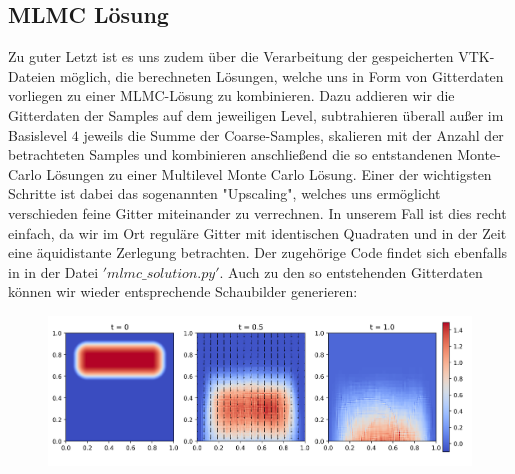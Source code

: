 \subsection{MLMC Lösung}
Zu guter Letzt ist es uns zudem über die Verarbeitung der gespeicherten VTK-Dateien möglich, die berechneten Lösungen, welche uns in Form von Gitterdaten vorliegen zu einer MLMC-Lösung zu kombinieren. Dazu addieren wir die Gitterdaten der Samples auf dem jeweiligen Level, subtrahieren überall außer im Basislevel $ 4 $ jeweils die Summe der Coarse-Samples, skalieren mit der Anzahl der betrachteten Samples und kombinieren anschließend die so entstandenen Monte-Carlo Lösungen zu einer Multilevel Monte Carlo Lösung.
Einer der wichtigsten Schritte ist dabei das sogenannten "Upscaling", welches uns ermöglicht verschieden feine Gitter miteinander zu verrechnen. In unserem Fall ist dies recht einfach, da wir im Ort reguläre Gitter mit identischen Quadraten und in der Zeit eine äquidistante Zerlegung betrachten. Der zugehörige Code findet sich ebenfalls in \cite{githubvtk} in der Datei $'mlmc\_solution.py'$.
Auch zu den so entstehenden Gitterdaten können wir wieder entsprechende Schaubilder generieren:
\begin{figure}[H]
	\centering
	\includegraphics[width=\textwidth]{plots/mlmc.png} 
\end{figure}

